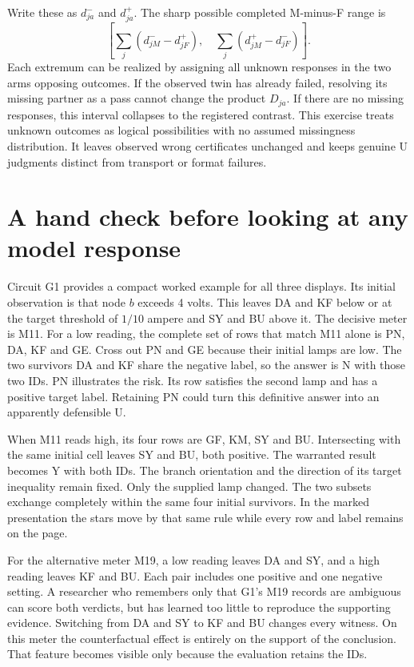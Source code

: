 \documentclass[12pt,letterpaper]{article}
\begin{document}
Write these as $d^-_{ja}$ and $d^+_{ja}$. The sharp possible completed M-minus-F range is
\[
 \left[\sum_j(d^-_{jM}-d^+_{jF}),\quad
        \sum_j(d^+_{jM}-d^-_{jF})\right].
\]
Each extremum can be realized by assigning all unknown responses in the two arms opposing outcomes. If the observed twin has already failed, resolving its missing partner as a pass cannot change the product $D_{ja}$. If there are no missing responses, this interval collapses to the registered contrast. This exercise treats unknown outcomes as logical possibilities with no assumed missingness distribution. It leaves observed wrong certificates unchanged and keeps genuine U judgments distinct from transport or format failures.

\section{A hand check before looking at any model response}

Circuit G1 provides a compact worked example for all three displays. Its initial observation is that node $b$ exceeds 4 volts. This leaves DA and KF below or at the target threshold of $1/10$ ampere and SY and BU above it. The decisive meter is M11. For a low reading, the complete set of rows that match M11 alone is PN, DA, KF and GE. Cross out PN and GE because their initial lamps are low. The two survivors DA and KF share the negative label, so the answer is N with those two IDs. PN illustrates the risk. Its row satisfies the second lamp and has a positive target label. Retaining PN could turn this definitive answer into an apparently defensible U.

When M11 reads high, its four rows are GF, KM, SY and BU. Intersecting with the same initial cell leaves SY and BU, both positive. The warranted result becomes Y with both IDs. The branch orientation and the direction of its target inequality remain fixed. Only the supplied lamp changed. The two subsets exchange completely within the same four initial survivors. In the marked presentation the stars move by that same rule while every row and label remains on the page.

For the alternative meter M19, a low reading leaves DA and SY, and a high reading leaves KF and BU. Each pair includes one positive and one negative setting. A researcher who remembers only that G1's M19 records are ambiguous can score both verdicts, but has learned too little to reproduce the supporting evidence. Switching from DA and SY to KF and BU changes every witness. On this meter the counterfactual effect is entirely on the support of the conclusion. That feature becomes visible only because the evaluation retains the IDs.
\end{document}

